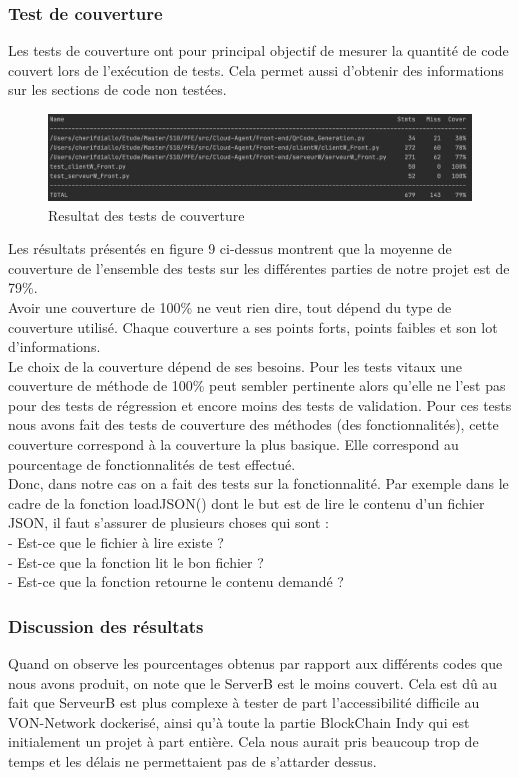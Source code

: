 \documentclass[12pt, openany]{report}
\begin{document}
\begin{flushleft}
\subsubsection{Test de couverture}
Les tests de couverture ont pour principal objectif de mesurer la quantité de code couvert lors de l'exécution de tests. Cela permet aussi d'obtenir des informations sur les sections de code non testées.
\begin{figure}[H]
\includegraphics[scale=0.5]{coverage.png}
\centering
\caption{Resultat des tests de couverture}
\end{figure}

Les résultats présentés en figure 9 ci-dessus montrent que la moyenne de couverture de l'ensemble des tests sur les différentes parties de notre projet est de 79\%.\\
Avoir une couverture de 100\% ne veut rien dire, tout dépend du type de couverture utilisé. Chaque couverture a ses points forts, points faibles et son lot d’informations.\\
Le choix de la couverture dépend de ses besoins.
Pour les tests vitaux une couverture de méthode de 100\% peut sembler pertinente alors qu’elle ne l’est pas pour des tests de régression et encore moins des tests de validation. Pour ces tests
nous avons fait des tests de couverture des méthodes (des fonctionnalités), cette couverture correspond à la couverture la plus basique. Elle correspond au pourcentage de fonctionnalités  de test effectué.\\
Donc, dans notre cas on a fait des tests sur la fonctionnalité. Par exemple dans le cadre de la fonction loadJSON() dont le but est de lire le contenu d'un fichier JSON, il faut s'assurer de plusieurs choses qui sont :\\
- Est-ce que le fichier à lire existe ?\\
- Est-ce que la fonction lit le bon fichier ?\\
- Est-ce que la fonction retourne le contenu demandé ?\\

\subsubsection{Discussion des résultats}
Quand on observe les pourcentages obtenus par rapport aux différents codes que nous avons produit, on note que le ServerB est le moins couvert. Cela est dû au fait que ServeurB est plus complexe à tester de part l'accessibilité difficile au VON-Network dockerisé, ainsi qu'à toute la partie BlockChain Indy qui est initialement un projet à part entière. Cela nous aurait pris beaucoup trop de temps et les délais ne permettaient pas de s'attarder dessus.

\end{flushleft}
\end{document}
